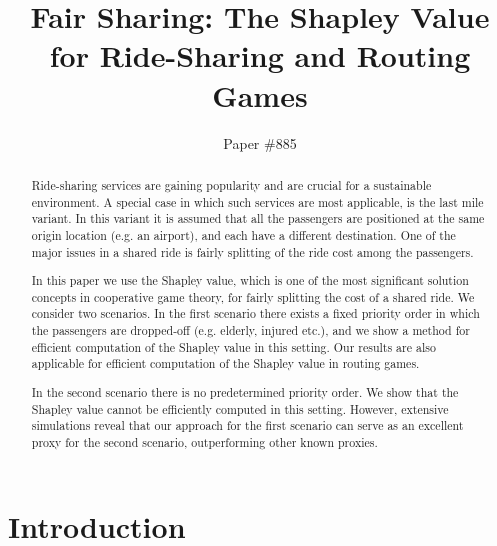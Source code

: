 \documentclass[sigconf]{aamas}
\title{Fair Sharing: The Shapley Value for Ride-Sharing and Routing Games}
\author{Paper \#885}
\begin{document}
\begin{abstract}
Ride-sharing services are gaining popularity and are crucial for a sustainable environment. A special case in which such services are most applicable, is the last mile variant. In this variant it is assumed that all the passengers are positioned at the same origin location (e.g. an airport), and each have a different destination. 
One of the major issues in a shared ride is fairly splitting of the ride cost among the passengers.

In this paper we use the Shapley value, which is one of the most significant solution concepts in cooperative game theory, for fairly splitting the cost of a shared ride.
We consider two scenarios. In the first scenario there exists a fixed priority order in which the passengers are dropped-off (e.g. elderly, injured etc.), and we show a method for efficient computation of the Shapley value in this setting. Our results are also applicable for efficient computation of the Shapley value in routing games. 

In the second scenario there is no predetermined priority order. We show that the Shapley value cannot be efficiently computed in this setting. However, extensive simulations reveal that our approach for the first scenario can serve as an excellent proxy for the second scenario, outperforming other known proxies.  

\end{abstract}


\maketitle

\section{Introduction}
\end{document}
